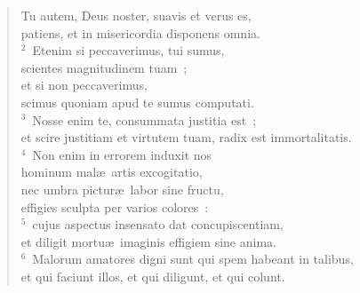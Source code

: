 \begin{flushleft}\begin{verse}\vspace{-19pt}\hspace{6pt}Tu autem, Deus noster, suavis et verus es,\\\hspace{6pt} patiens, et in misericordia disponens omnia.\\
${}^{2}$~Etenim si peccaverimus, tui sumus,\\ scientes magnitudinem tuam~;\\ et si non peccaverimus,\\ scimus quoniam apud te sumus computati.\\
${}^{3}$~Nosse enim te, consummata justitia est~;\\ et scire justitiam et virtutem tuam, radix est immortalitatis.\\
${}^{4}$~Non enim in errorem induxit nos\\ hominum mal\ae\ artis excogitatio,\\ nec umbra pictur\ae\ labor sine fructu,\\ effigies sculpta per varios colores~:\\
${}^{5}$~cujus aspectus insensato dat concupiscentiam,\\ et diligit mortu\ae\ imaginis effigiem sine anima.\\
${}^{6}$~Malorum amatores digni sunt qui spem habeant in talibus,\\ et qui faciunt illos, et qui diligunt, et qui colunt.\end{verse}\end{flushleft}


